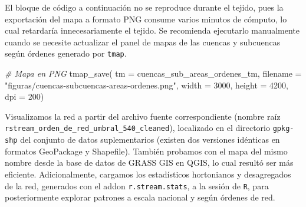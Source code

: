 \documentclass[spanish]{article}
\newenvironment{Shaded}{\begin{snugshade}}{\end{snugshade}}
\newcommand{\AttributeTok}[1]{\textcolor[rgb]{0.77,0.63,0.00}{#1}}
\newcommand{\CommentTok}[1]{\textcolor[rgb]{0.56,0.35,0.01}{\textit{#1}}}
\newcommand{\DecValTok}[1]{\textcolor[rgb]{0.00,0.00,0.81}{#1}}
\newcommand{\FunctionTok}[1]{\textcolor[rgb]{0.00,0.00,0.00}{#1}}
\newcommand{\NormalTok}[1]{#1}
\newcommand{\StringTok}[1]{\textcolor[rgb]{0.31,0.60,0.02}{#1}}
\begin{document}
El bloque de código a continuación no se reproduce durante el tejido,
pues la exportación del mapa a formato PNG consume varios minutos de
cómputo, lo cual retardaría innecesariamente el tejido. Se recomienda
ejecutarlo manualmente cuando se necesite actualizar el panel de mapas
de las cuencas y subcuencas según órdenes generado por \texttt{tmap}.

\begin{Shaded}
\begin{Highlighting}[]
\CommentTok{\# Mapa en PNG}
\FunctionTok{tmap\_save}\NormalTok{(}
  \AttributeTok{tm =}\NormalTok{ cuencas\_sub\_areas\_ordenes\_tm,}
  \AttributeTok{filename =} \StringTok{"figuras/cuencas{-}subcuencas{-}areas{-}ordenes.png"}\NormalTok{,}
  \AttributeTok{width =} \DecValTok{3000}\NormalTok{, }\AttributeTok{height =} \DecValTok{4200}\NormalTok{, }\AttributeTok{dpi =} \DecValTok{200}\NormalTok{)}
\end{Highlighting}
\end{Shaded}

Visualizamos la red a partir del archivo fuente correspondiente (nombre
raíz \texttt{rstream\_orden\_de\_red\_umbral\_540\_cleaned}), localizado
en el directorio \texttt{gpkg-shp} del conjunto de datos suplementarios
(existen dos versiones idénticas en formatos GeoPackage y Shapefile).
También probamos con el mapa del mismo nombre desde la base de datos de
GRASS GIS en QGIS, lo cual resultó ser más eficiente. Adicionalmente,
cargamos los estadísticos hortonianos y desagregados de la red,
generados con el addon \texttt{r.stream.stats}, a la sesión de
\texttt{R}, para posteriormente explorar patrones a escala nacional y
según órdenes de red.
\end{document}
